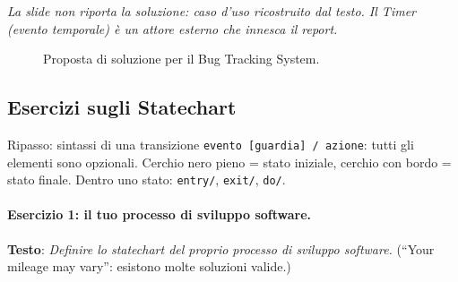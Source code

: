 \documentclass[12pt]{extarticle}
\newcommand{\actor}[4]{\begin{scope}[shift={(#2,#3)}]
  \node[circle,draw,semithick,minimum size=0.4cm,inner sep=0] at (0,0.55) {};
  \draw[semithick] (0,0.35)--(0,-0.2) (-0.3,0.15)--(0.3,0.15) (0,-0.2)--(-0.25,-0.7) (0,-0.2)--(0.25,-0.7);
  \node[minimum width=0.8cm,minimum height=1.4cm] (#1) at (0,0) {};
  \node[font=\footnotesize\sffamily,anchor=north,align=center] at (0,-0.75) {#4};
\end{scope}}
\newcommand{\sysbox}[5]{\draw[semithick] (#1,#2) rectangle (#3,#4); \node[font=\small\bfseries\sffamily, anchor=north] at ({(#1+#3)/2},#4-0.1) {#5};}
\begin{document}
\noindent \textit{La slide non riporta la soluzione: caso d'uso ricostruito dal testo. Il Timer (evento temporale) è un attore esterno che innesca il report.}

\begin{figure}[H]
    \centering
{}
    \caption{Proposta di soluzione per il Bug Tracking System.}
\end{figure}

\subsection{Esercizi sugli Statechart}

\begin{cbox}{Ripasso: sintassi di una transizione}
\noindent \texttt{evento [guardia] / azione}: tutti gli elementi sono opzionali. Cerchio nero pieno = stato iniziale, cerchio con bordo = stato finale. Dentro uno stato: \texttt{entry/}, \texttt{exit/}, \texttt{do/}.
\end{cbox}

\paragraph{Esercizio 1: il tuo processo di sviluppo software.}
\textbf{Testo}: \textit{Definire lo statechart del proprio processo di sviluppo software.} (``Your mileage may vary'': esistono molte soluzioni valide.)
\end{document}
